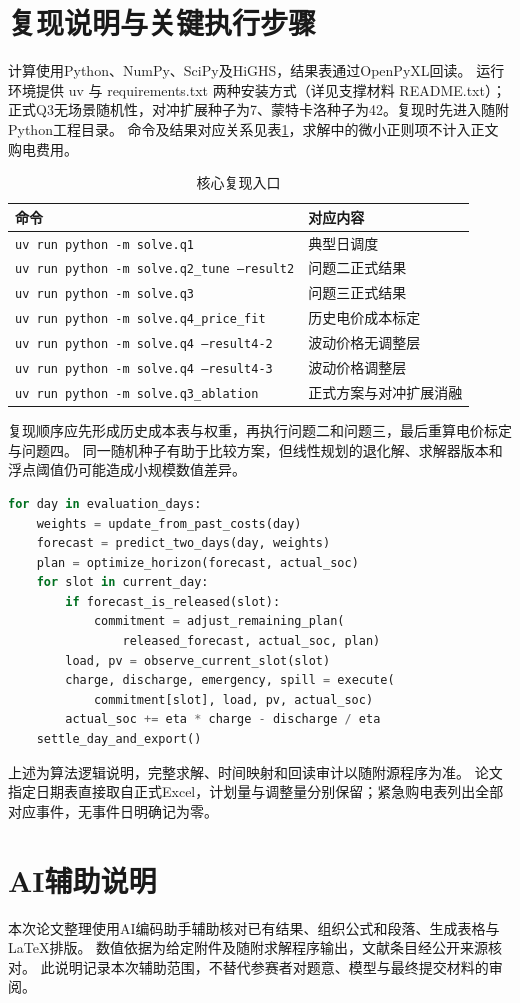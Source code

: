 \section{复现说明与关键执行步骤}
计算使用Python、NumPy、SciPy及HiGHS，结果表通过OpenPyXL回读。
运行环境提供 uv 与 requirements.txt 两种安装方式（详见支撑材料 README.txt）；正式Q3无场景随机性，对冲扩展种子为7、蒙特卡洛种子为42。复现时先进入随附Python工程目录。
命令及结果对应关系见表\ref{tab:repro}，求解中的微小正则项不计入正文购电费用。
\begin{table}[htbp]\centering
\caption{核心复现入口}\label{tab:repro}
\small
\begin{tabularx}{\textwidth}{p{}X}
\toprule
命令 & 对应内容\\\midrule
\texttt{uv run python -m solve.q1} & 典型日调度\\
\texttt{uv run python -m solve.q2\_tune --result2} & 问题二正式结果\\
\texttt{uv run python -m solve.q3} & 问题三正式结果\\
\texttt{uv run python -m solve.q4\_price\_fit} & 历史电价成本标定\\
\texttt{uv run python -m solve.q4 --result4-2} & 波动价格无调整层\\
\texttt{uv run python -m solve.q4 --result4-3} & 波动价格调整层\\
\texttt{uv run python -m solve.q3\_ablation} & 正式方案与对冲扩展消融\\
\bottomrule
\end{tabularx}
\end{table}
复现顺序应先形成历史成本表与权重，再执行问题二和问题三，最后重算电价标定与问题四。
同一随机种子有助于比较方案，但线性规划的退化解、求解器版本和浮点阈值仍可能造成小规模数值差异。
\begin{lstlisting}[language=Python,basicstyle=\ttfamily\footnotesize,breaklines=true]
for day in evaluation_days:
    weights = update_from_past_costs(day)
    forecast = predict_two_days(day, weights)
    plan = optimize_horizon(forecast, actual_soc)
    for slot in current_day:
        if forecast_is_released(slot):
            commitment = adjust_remaining_plan(
                released_forecast, actual_soc, plan)
        load, pv = observe_current_slot(slot)
        charge, discharge, emergency, spill = execute(
            commitment[slot], load, pv, actual_soc)
        actual_soc += eta * charge - discharge / eta
    settle_day_and_export()
\end{lstlisting}
上述为算法逻辑说明，完整求解、时间映射和回读审计以随附源程序为准。
论文指定日期表直接取自正式Excel，计划量与调整量分别保留；紧急购电表列出全部对应事件，无事件日明确记为零。

\section{AI辅助说明}
本次论文整理使用AI编码助手辅助核对已有结果、组织公式和段落、生成表格与LaTeX排版。
数值依据为给定附件及随附求解程序输出，文献条目经公开来源核对。
此说明记录本次辅助范围，不替代参赛者对题意、模型与最终提交材料的审阅。
